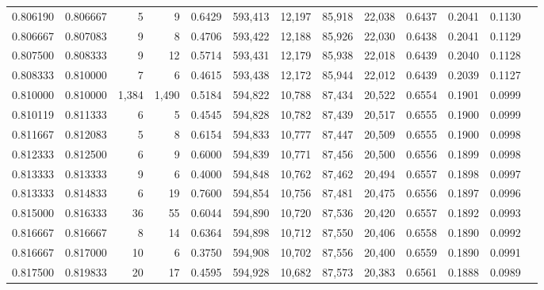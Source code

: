 \begin{tabular}{rrrrrrrrrrrrr}
0.806190 & 0.806667 &      5 &     9 &                                     0.6429 & 593,413 &  12,197 &  85,918 &  22,038 & 0.6437 & 0.2041 & 0.1130 \\
0.806667 & 0.807083 &      9 &     8 &                                     0.4706 & 593,422 &  12,188 &  85,926 &  22,030 & 0.6438 & 0.2041 & 0.1129 \\
0.807500 & 0.808333 &      9 &    12 &                                     0.5714 & 593,431 &  12,179 &  85,938 &  22,018 & 0.6439 & 0.2040 & 0.1128 \\
0.808333 & 0.810000 &      7 &     6 &                                     0.4615 & 593,438 &  12,172 &  85,944 &  22,012 & 0.6439 & 0.2039 & 0.1127 \\
0.810000 & 0.810000 &  1,384 & 1,490 &                                     0.5184 & 594,822 &  10,788 &  87,434 &  20,522 & 0.6554 & 0.1901 & 0.0999 \\
0.810119 & 0.811333 &      6 &     5 &                                     0.4545 & 594,828 &  10,782 &  87,439 &  20,517 & 0.6555 & 0.1900 & 0.0999 \\
0.811667 & 0.812083 &      5 &     8 &                                     0.6154 & 594,833 &  10,777 &  87,447 &  20,509 & 0.6555 & 0.1900 & 0.0998 \\
0.812333 & 0.812500 &      6 &     9 &                                     0.6000 & 594,839 &  10,771 &  87,456 &  20,500 & 0.6556 & 0.1899 & 0.0998 \\
0.813333 & 0.813333 &      9 &     6 &                                     0.4000 & 594,848 &  10,762 &  87,462 &  20,494 & 0.6557 & 0.1898 & 0.0997 \\
0.813333 & 0.814833 &      6 &    19 &                                     0.7600 & 594,854 &  10,756 &  87,481 &  20,475 & 0.6556 & 0.1897 & 0.0996 \\
0.815000 & 0.816333 &     36 &    55 &                                     0.6044 & 594,890 &  10,720 &  87,536 &  20,420 & 0.6557 & 0.1892 & 0.0993 \\
0.816667 & 0.816667 &      8 &    14 &                                     0.6364 & 594,898 &  10,712 &  87,550 &  20,406 & 0.6558 & 0.1890 & 0.0992 \\
0.816667 & 0.817000 &     10 &     6 &                                     0.3750 & 594,908 &  10,702 &  87,556 &  20,400 & 0.6559 & 0.1890 & 0.0991 \\
0.817500 & 0.819833 &     20 &    17 &                                     0.4595 & 594,928 &  10,682 &  87,573 &  20,383 & 0.6561 & 0.1888 & 0.0989 \\

\end{tabular}
